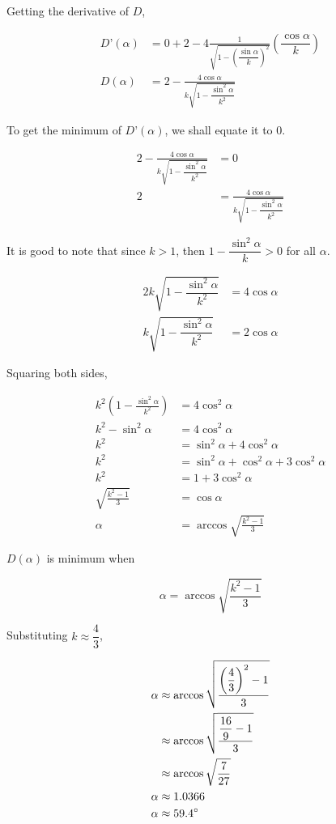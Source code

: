 \documentclass[a4paper,12pt]{article}
\begin{document}
Getting the derivative of $D$,

\begin{align*}
D’(\alpha) &= 0 + 2 - 4 \frac{1}{ \sqrt{1 -  \left( \dfrac{\sin \alpha}{k} \right) ^2 } } \left(  \dfrac{\cos \alpha}{k} \right) \\
D(\alpha) &= 2 - \frac{4 \cos \alpha}{k \sqrt{1 -  \dfrac{\sin^2 \alpha}{k^2}}}
\end{align*}

To get the minimum of $D’(\alpha)$, we shall equate it to $0$.

\begin{align*}
2 - \frac{4 \cos \alpha}{k \sqrt{1 -  \dfrac{\sin^2 \alpha}{k^2}}} &= 0\\
2 &=  \frac{4 \cos \alpha}{k \sqrt{1 -  \dfrac{\sin^2 \alpha}{k^2}}}
\end{align*}

It is good to note that since $k>1$, then $1-\dfrac{\sin^2 \alpha}{k} >0$ for all $\alpha$.

\begin{align*}
2 k \sqrt{1 -  \dfrac{\sin^2 \alpha}{k^2}} &= 4 \cos \alpha\\
k \sqrt{1 -  \dfrac{\sin^2 \alpha}{k^2}} &= 2\cos \alpha
\end{align*}

Squaring both sides,

\begin{align*}
k^2 \left(1 -  \frac{\sin^2 \alpha}{k^2} \right) &= 4 \cos^2 \alpha\\
k^2 - \sin^2 \alpha &= 4 \cos^2 \alpha\\
k^2 &= \sin^2 \alpha + 4 \cos^2 \alpha\\
k^2 &= \sin^2 \alpha + \cos^2 \alpha + 3\cos^2 \alpha\\
k^2 &= 1 + 3\cos^2 \alpha\\
\sqrt{\frac{k^2 -1}{3}} &= \cos \alpha\\
\alpha &=  \arccos \sqrt{\frac{k^2 -1}{3}}
\end{align*}

$D(\alpha)$ is minimum when 

\begin{equation}\label{min}
\alpha =  \arccos \sqrt{\frac{k^2 -1}{3}}
\end{equation}

Substituting $k \approx \dfrac{4}{3}$,

\begin{align*}
\alpha &\approx  \arccos \sqrt{\dfrac{ \left( \dfrac{4}{3} \right)^2 -1}{3}}\\
&\approx \arccos \sqrt{\dfrac{ \dfrac{16}{9} -1}{3}}\\
&\approx \arccos \sqrt{\dfrac{7}{27}}\\
\alpha &\approx 1.0366\\
\alpha &\approx 59.4 \degree
\end{align*}
\end{document}
